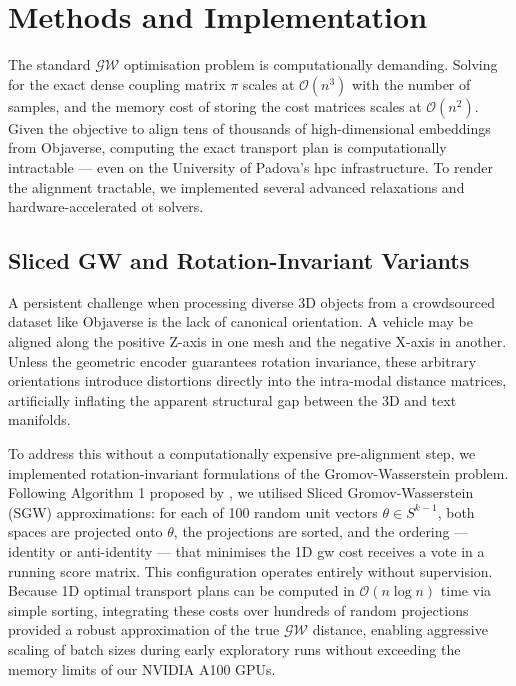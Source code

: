 \section{Methods and Implementation}
\label{sec:gw_methods}

The standard $\mathcal{GW}$ optimisation problem is computationally demanding. Solving for the exact dense coupling matrix $\pi$ scales at $\mathcal{O}(n^3)$ with the number of samples, and the memory cost of storing the cost matrices scales at $\mathcal{O}(n^2)$. Given the objective to align tens of thousands of high-dimensional embeddings from Objaverse, computing the exact transport plan is computationally intractable --- even on the University of Padova's \gls{hpc} infrastructure. To render the alignment tractable, we implemented several advanced relaxations and hardware-accelerated \gls{ot} solvers.

\subsection{Sliced GW and Rotation-Invariant Variants}
\label{subsec:sliced_gw}

A persistent challenge when processing diverse 3D objects from a crowdsourced dataset like Objaverse is the lack of canonical orientation. A vehicle may be aligned along the positive Z-axis in one mesh and the negative X-axis in another. Unless the geometric encoder guarantees rotation invariance, these arbitrary orientations introduce distortions directly into the intra-modal distance matrices, artificially inflating the apparent structural gap between the 3D and text manifolds.

To address this without a computationally expensive pre-alignment step, we implemented rotation-invariant formulations of the Gromov-Wasserstein problem. Following Algorithm 1 proposed by \textcite{vayer2019optimal}, we utilised Sliced Gromov-Wasserstein (SGW) approximations: for each of 100 random unit vectors $\theta \in S^{k-1}$, both spaces are projected onto $\theta$, the projections are sorted, and the ordering --- identity or anti-identity --- that minimises the 1D \gls{gw} cost receives a vote in a running score matrix. This configuration operates entirely without supervision. Because 1D optimal transport plans can be computed in $\mathcal{O}(n \log n)$ time via simple sorting, integrating these costs over hundreds of random projections provided a robust approximation of the true $\mathcal{GW}$ distance, enabling aggressive scaling of batch sizes during early exploratory runs without exceeding the memory limits of our NVIDIA A100 GPUs.

